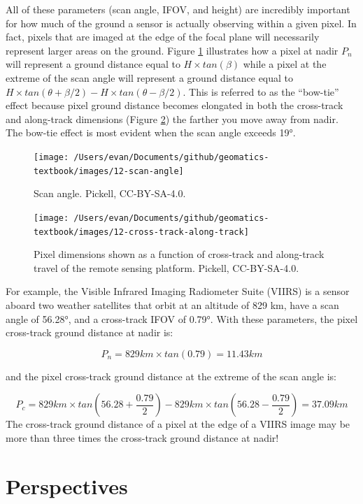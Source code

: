 \documentclass[
]{book}
\begin{document}
All of these parameters (scan angle, IFOV, and height) are incredibly important for how much of the ground a sensor is actually observing within a given pixel. In fact, pixels that are imaged at the edge of the focal plane will necessarily represent larger areas on the ground. Figure \ref{fig:12-scan-angle} illustrates how a pixel at nadir \(P_n\) will represent a ground distance equal to \(H × tan(β)\) while a pixel at the extreme of the scan angle will represent a ground distance equal to \(H × tan(θ + β/2) - H × tan(θ - β/2)\). This is referred to as the ``bow-tie'' effect because pixel ground distance becomes elongated in both the cross-track and along-track dimensions (Figure \ref{fig:12-cross-track-along-track}) the farther you move away from nadir. The bow-tie effect is most evident when the scan angle exceeds 19°.

\begin{figure}
\texttt{[image: /Users/evan/Documents/github/geomatics-textbook/images/12-scan-angle]} \caption{Scan angle. Pickell, CC-BY-SA-4.0.}\label{fig:12-scan-angle}
\end{figure}

\begin{figure}
\texttt{[image: /Users/evan/Documents/github/geomatics-textbook/images/12-cross-track-along-track]} \caption{Pixel dimensions shown as a function of cross-track and along-track travel of the remote sensing platform. Pickell, CC-BY-SA-4.0.}\label{fig:12-cross-track-along-track}
\end{figure}

For example, the Visible Infrared Imaging Radiometer Suite (VIIRS) is a sensor aboard two weather satellites that orbit at an altitude of 829 km, have a scan angle of 56.28°, and a cross-track IFOV of 0.79°. With these parameters, the pixel cross-track ground distance at nadir is:

\[
P_n = 829 km × tan(0.79) = 11.43 km
\]

and the pixel cross-track ground distance at the extreme of the scan angle is:

\[
P_c = 829 km × tan(56.28+\frac{0.79}{2}) - 829 km × tan(56.28-\frac{0.79}{2})=37.09km
\]
The cross-track ground distance of a pixel at the edge of a VIIRS image may be more than three times the cross-track ground distance at nadir!

\hypertarget{perspectives}{%
\section{Perspectives}\label{perspectives}}
\end{document}
